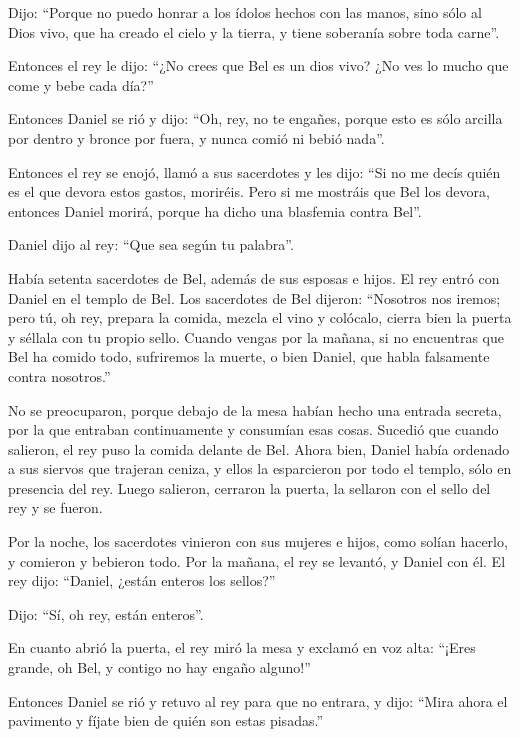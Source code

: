  Dijo: ``Porque no puedo honrar a los ídolos hechos con
las manos, sino sólo al Dios vivo, que ha creado el cielo y la tierra, y
tiene soberanía sobre toda carne''.

 Entonces el rey le dijo: ``¿No crees que Bel es un dios
vivo? ¿No ves lo mucho que come y bebe cada día?''

 Entonces Daniel se rió y dijo: ``Oh, rey, no te engañes,
porque esto es sólo arcilla por dentro y bronce por fuera, y nunca comió
ni bebió nada''.

 Entonces el rey se enojó, llamó a sus sacerdotes y les
dijo: ``Si no me decís quién es el que devora estos gastos, moriréis.
 Pero si me mostráis que Bel los devora, entonces Daniel
morirá, porque ha dicho una blasfemia contra Bel''.

Daniel dijo al rey: ``Que sea según tu palabra''.

 Había setenta sacerdotes de Bel, además de sus esposas e
hijos. El rey entró con Daniel en el templo de Bel.  Los
sacerdotes de Bel dijeron: ``Nosotros nos iremos; pero tú, oh rey,
prepara la comida, mezcla el vino y colócalo, cierra bien la puerta y
séllala con tu propio sello.  Cuando vengas por la
mañana, si no encuentras que Bel ha comido todo, sufriremos la muerte, o
bien Daniel, que habla falsamente contra nosotros.''

 No se preocuparon, porque debajo de la mesa habían hecho
una entrada secreta, por la que entraban continuamente y consumían esas
cosas.  Sucedió que cuando salieron, el rey puso la
comida delante de Bel. Ahora bien, Daniel había ordenado a sus siervos
que trajeran ceniza, y ellos la esparcieron por todo el templo, sólo en
presencia del rey. Luego salieron, cerraron la puerta, la sellaron con
el sello del rey y se fueron.

 Por la noche, los sacerdotes vinieron con sus mujeres e
hijos, como solían hacerlo, y comieron y bebieron todo. 
Por la mañana, el rey se levantó, y Daniel con él.  El
rey dijo: ``Daniel, ¿están enteros los sellos?''

Dijo: ``Sí, oh rey, están enteros''.

 En cuanto abrió la puerta, el rey miró la mesa y exclamó
en voz alta: ``¡Eres grande, oh Bel, y contigo no hay engaño alguno!''

 Entonces Daniel se rió y retuvo al rey para que no
entrara, y dijo: ``Mira ahora el pavimento y fíjate bien de quién son
estas pisadas.''

